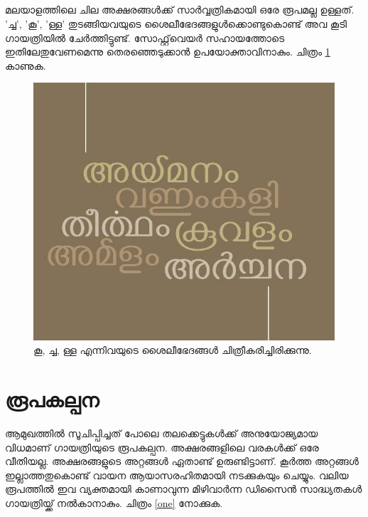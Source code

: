 \documentclass[a4paper, 12pt]{report}
\begin{document}
	\paragraph{}
	മലയാളത്തിലെ ചില അക്ഷരങ്ങള്‍ക്ക് സാര്‍വ്വത്രികമായി ഒരേ രൂപമല്ല ഉള്ളത്. 'ച്ച', 'കൂ', 'ള്ള' തുടങ്ങിയവയുടെ ശൈലീഭേദങ്ങളുള്‍ക്കൊണ്ടുകൊണ്ട് അവ കൂടി ഗായത്രിയിൽ ചേര്‍ത്തിട്ടുണ്ട്. സോഫ്റ്റ്‌വെയര്‍ സഹായത്തോടെ ഇതിലേതുവേണമെന്നു തെരഞ്ഞെടുക്കാന്‍ ഉപയോക്താവിനാകും. ചിത്രം \ref{style} കാണുക. 
	‍ 
	\begin{figure}
		\begin{centering}
			\includegraphics[width=1.0\textwidth]{style.jpg}
			\caption{കൂ, ച്ച, ള്ള എന്നിവയുടെ ശൈലീഭേദങ്ങൾ ചിത്രീകരിച്ചിരിക്കുന്നു.}
			\label{style}
		\end{centering}
	\end{figure}
	
	
	\chapter*{രൂപകല്പന}
	
	ആമുഖത്തില്‍ സൂചിപ്പിച്ചത് പോലെ തലക്കെട്ടുകള്‍ക്ക് അനുയോജ്യമായ വിധമാണ് ഗായത്രിയുടെ രൂപകല്പന‍. അക്ഷരങ്ങളിലെ വരകൾക്ക് ഒരേ വീതിയല്ല. അക്ഷരങ്ങളുടെ അറ്റങ്ങള്‍ ഏതാണ്ട് ഉരുണ്ടിട്ടാണ്. കൂർത്ത അറ്റങ്ങൾ ഇല്ലാത്തതുകൊണ്ട് വായന ആയാസരഹിതമായി നടക്കുകയും ചെയ്യും.  വലിയ രൂപത്തില്‍ ഇവ വ്യക്തമായി കാണാവുന്ന മിഴിവാര്‍ന്ന ഡിസൈന്‍ സാദ്ധ്യതകള്‍ ഗായത്രിയ്ക്ക് നല്‍കാനാകും.  ചിത്രം \ref{one} നോക്കുക.
	
\end{document}
